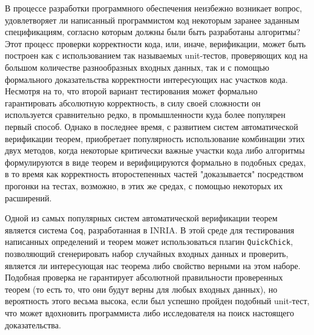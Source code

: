 



\usepackage{fancyvrb}
\usepackage{tikz}
\usepackage{float}
\usetikzlibrary{arrows}



\DeclareMathOperator{\bttr}{T\_tr}
\DeclareMathOperator{\btnil}{T\_nil}

\newcommand{\tbttr}{T\_tr}
\newcommand{\tcoq}{\texttt{Coq}}
\newcommand{\tqc}{\texttt{QuickChick}}


\Intro

В процессе разработки программного обеспечения неизбежно возникает вопрос, удовлетворяет ли написанный программистом код некоторым заранее заданным спецификациям, согласно которым должны были быть разработаны алгоритмы? Этот процесс проверки корректности кода, или, иначе, верификации, может быть построен как с использованием так называемых unit-тестов, проверяющих код на большом количестве разнообразных входных данных, так и с помощью формального доказательства корректности интересующих нас участков кода. Несмотря на то, что второй вариант тестирования может формально гарантировать абсолютную корректность, в силу своей сложности он используется сравнительно редко, в промышленности куда более популярен первый способ. Однако в последнее время, с развитием систем автоматической верификации теорем, приобретает популярность использование комбинации этих двух методов, когда некоторые критически важные участки кода либо алгоритмы формулируются в виде теорем и верифицируются формально в подобных средах, в то время как корректность второстепенных частей "доказывается" посредством прогонки на тестах, возможно, в этих же средах, с помощью некоторых их расширений.

Одной из самых популярных систем автоматической верификации теорем является система \tcoq, разработанная в INRIA. В этой среде для тестирования написанных определений и теорем может использоваться плагин \tqc, позволяющий сгенерировать набор случайных входных данных и проверить, является ли интересующая нас теорема либо свойство верными на этом наборе. Подобная проверка не гарантирует абсолютной правильности проверенных теорем (то есть то, что они будут верны для любых входных данных), но вероятность этого весьма высока, если был успешно пройден подобный unit-тест, что может вдохновить программиста либо исследователя на поиск настоящего доказательства.

